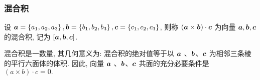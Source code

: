 % 
% 

\subsubsection{混合积}

\begin{definition}[向量的混合积]
    设 $ \vb*{a}=\left\{a_{1}, a_{2}, a_{3}\right\}, \vb*{b}=\left\{b_{1}, b_{2}, b_{3}\right\}, \vb*{c}=\left\{c_{1}, c_{2}, c_{3}\right\}$, 
    则称 $ (\vb*{a} \times \vb*{b}) \cdot \vb*{c} $ 为向量 $ \vb*{a}, \vb*{b}, \vb*{c} $ 的混合积, 记为 $ [\vb*{a}, \vb*{b}, \vb*{c}] $.
\end{definition}

\begin{theorem}[共面条件]
    混合积是一数量, 其几何意义为: 混合积的绝对值等于以 $ \vb*{a}$ 、$ \vb*{b} $、$ \vb*{c} $ 为相邻三条棱的平行六面体的体积.
    因此, 向量 $ \vb*{a}$ 、$ \vb*{b} $、$ \vb*{c} $ 共面的充分必要条件是 $ (a \times b) \cdot c=0 .$
\end{theorem}
